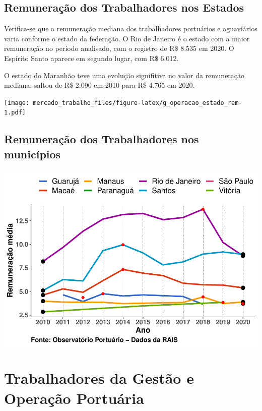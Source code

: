 \documentclass[
]{article}
\begin{document}
\hypertarget{remunerauxe7uxe3o-dos-trabalhadores-nos-estados}{%
\subsection{Remuneração dos Trabalhadores nos
Estados}\label{remunerauxe7uxe3o-dos-trabalhadores-nos-estados}}

Verifica-se que a remuneração mediana dos trabalhadores portuários e
aguaviários varia conforme o estado da federação. O Rio de Janeiro é o
estado com a maior remuneração no período analisado, com o registro de
R\$ 8.535 em 2020. O Espírito Santo aparece em segundo lugar, com R\$
6.012.

O estado do Maranhão teve uma evolução signifitiva no valor da
remuneração mediana: saltou de R\$ 2.090 em 2010 para R\$ 4.765 em 2020.

\texttt{[image: mercado\_trabalho\_files/figure-latex/g\_operacao\_estado\_rem-1.pdf]}

\hypertarget{remunerauxe7uxe3o-dos-trabalhadores-nos-municuxedpios}{%
\subsection{Remuneração dos Trabalhadores nos
municípios}\label{remunerauxe7uxe3o-dos-trabalhadores-nos-municuxedpios}}

\includegraphics{mercado_trabalho_files/figure-latex/g_operacao_municipio-1.pdf}

\hypertarget{trabalhadores-da-gestuxe3o-e-operauxe7uxe3o-portuuxe1ria}{%
\section{Trabalhadores da Gestão e Operação
Portuária}\label{trabalhadores-da-gestuxe3o-e-operauxe7uxe3o-portuuxe1ria}}
\end{document}
